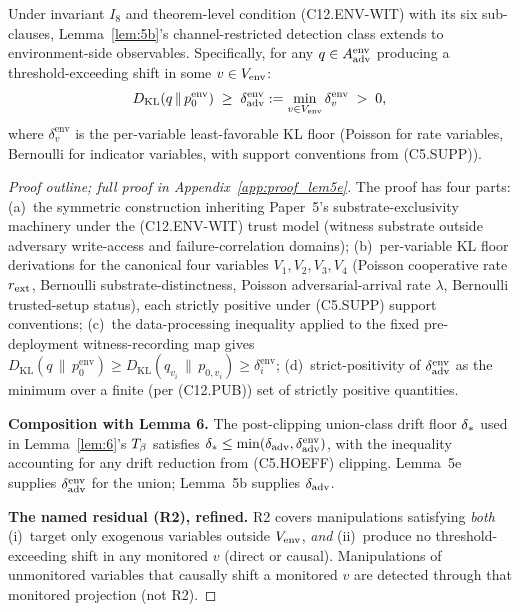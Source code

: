 \addtocounter{lemma}{-1}\renewcommand{\thelemma}{5e}
\begin{lemma}
\label{lem:5e}
Under invariant $I_8$ and theorem-level condition (C12.ENV-WIT)
with its six sub-clauses, Lemma~\ref{lem:5b}'s channel-restricted
detection class extends to environment-side observables.
Specifically, for any $q \in A_{\mathrm{adv}}^{\mathrm{env}}$ producing a
threshold-exceeding shift in some $v \in V_{\mathrm{env}}$:
\[
  D_{\mathrm{KL}}(q \,\|\, p_0^{\mathrm{env}}) \;\geq\;
  \delta_{\mathrm{adv}}^{\mathrm{env}} := \min_{v \in V_{\mathrm{env}}}
  \delta_v^{\mathrm{env}} \;>\; 0,
\]
where $\delta_v^{\mathrm{env}}$ is the per-variable least-favorable
KL floor (Poisson for rate variables, Bernoulli for indicator
variables, with support conventions from (C5.SUPP)).
\end{lemma}

\begin{proof}[Proof outline; full proof in Appendix~\ref{app:proof_lem5e}]
The proof has four parts:
(a)~the symmetric construction inheriting Paper~5's
substrate-exclusivity machinery under the (C12.ENV-WIT) trust
model (witness substrate outside adversary write-access and
failure-correlation domains);
(b)~per-variable KL floor derivations for the canonical four
variables $V_1, V_2, V_3, V_4$ (Poisson cooperative rate $r_{\mathrm{ext}}$,
Bernoulli substrate-distinctness, Poisson adversarial-arrival
rate $\lambda$, Bernoulli trusted-setup status), each strictly
positive under (C5.SUPP) support conventions;
(c)~the data-processing inequality applied to the fixed
pre-deployment witness-recording map gives
$D_{\mathrm{KL}}(q \,\|\, p_0^{\mathrm{env}}) \geq
D_{\mathrm{KL}}(q_{v_i} \,\|\, p_{0, v_i}) \geq
\delta_i^{\mathrm{env}}$;
(d)~strict-positivity of $\delta_{\mathrm{adv}}^{\mathrm{env}}$ as the minimum
over a finite (per (C12.PUB)) set of strictly positive
quantities.

\textbf{Composition with Lemma 6.}  The post-clipping union-class
drift floor $\delta_{*}$ used in Lemma~\ref{lem:6}'s $T_{\beta}$
satisfies $\delta_{*} \leq \min(\delta_{\mathrm{adv}},
\delta_{\mathrm{adv}}^{\mathrm{env}})$, with the inequality accounting for any
drift reduction from (C5.HOEFF) clipping.  Lemma~5e supplies
$\delta_{\mathrm{adv}}^{\mathrm{env}}$ for the union; Lemma~5b supplies
$\delta_{\mathrm{adv}}$.

\textbf{The named residual (R2), refined.}  R2 covers manipulations
satisfying \emph{both} (i)~target only exogenous variables outside
$V_{\mathrm{env}}$, \emph{and} (ii)~produce no threshold-exceeding shift in any
monitored $v$ (direct or causal).  Manipulations of unmonitored
variables that causally shift a monitored $v$ are detected through
that monitored projection (not R2).
\end{proof}

